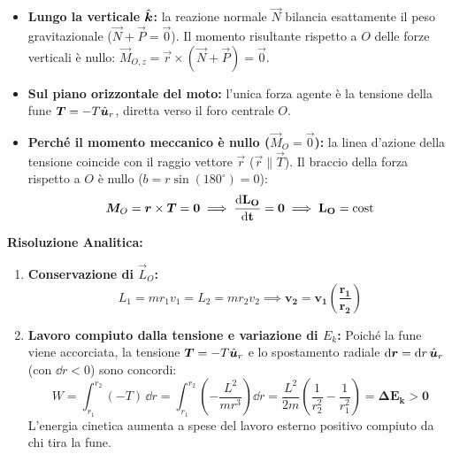 \begin{tcolorbox}[enhanced, breakable, colback=forestgreen!5!white, colframe=forestgreen!80!black,
    title={\textbf{Analisi delle Forze e dei Momenti Meccanici}}, fonttitle=\bfseries\sffamily]
\begin{itemize}
    \item \textbf{Lungo la verticale $\hat{\bm{k}}$:} la reazione normale $\vec{N}$ bilancia esattamente il peso gravitazionale ($\vec{N} + \vec{P} = \vec{0}$). Il momento risultante rispetto a $O$ delle forze verticali è nullo: $\vec{M}_{O,z} = \vec{r}\times(\vec{N}+\vec{P}) = \vec{0}$.
    \item \textbf{Sul piano orizzontale del moto:} l'unica forza agente è la tensione della fune $\bm{T} = -T\hat{\bm{u}}_r$, diretta verso il foro centrale $O$.
    \item \textbf{Perché il momento meccanico è nullo ($\vec{M}_O = \vec{0}$):} la linea d'azione della tensione coincide con il raggio vettore $\vec{r}$ ($\vec{r} \parallel \vec{T}$). Il braccio della forza rispetto a $O$ è nullo ($b = r\sin(180^\circ) = 0$):
    \begin{equation}
        \bm{M}_O = \bm{r}\times\bm{T} = \bm{0} \implies \mathbf{\frac{\mathrm{d} \bm{L}_O}{\mathrm{d} t} = \bm{0} \implies \bm{L}_O = \text{cost}}
    \end{equation}
\end{itemize}
\end{tcolorbox}

\textbf{Risoluzione Analitica:}
\begin{enumerate}
    \item \textbf{Conservazione di $\vec{L}_O$:}
    \begin{equation}
        L_1 = m r_1 v_1 = L_2 = m r_2 v_2 \implies \mathbf{v_2 = v_1\left(\frac{r_1}{r_2}\right)}
    \end{equation}
    \item \textbf{Lavoro compiuto dalla tensione e variazione di $E_k$:}
    Poiché la fune viene accorciata, la tensione $\bm{T} = -T\hat{\bm{u}}_r$ e lo spostamento radiale $\mathrm{d}\bm{r} = \mathrm{d} r\,\hat{\bm{u}}_r$ (con $\dd r < 0$) sono concordi:
    \begin{equation}
        W = \int_{r_1}^{r_2} (-T)\,\dd r = \int_{r_1}^{r_2} \left(-\frac{L^2}{m r^3}\right)\dd r = \frac{L^2}{2m}\left(\frac{1}{r_2^2} - \frac{1}{r_1^2}\right) = \mathbf{\Delta E_k > 0}
    \end{equation}
    L'energia cinetica aumenta a spese del lavoro esterno positivo compiuto da chi tira la fune.
\end{enumerate}
